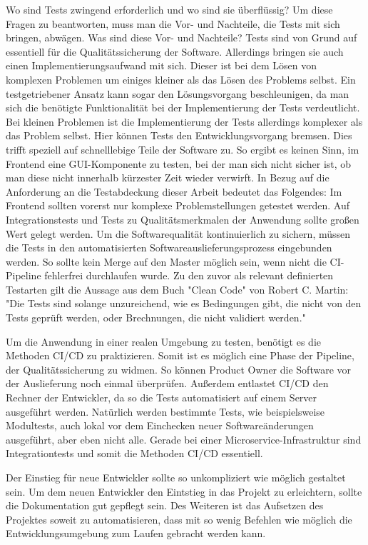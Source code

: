 Wo sind Tests zwingend erforderlich und wo sind sie überflüssig? Um diese Fragen zu beantworten, muss
man die Vor- und Nachteile, die Tests mit sich bringen, abwägen. Was sind diese Vor- und Nachteile?
Tests sind von Grund auf essentiell für die Qualitätssicherung der Software. Allerdings bringen sie auch
einen Implementierungsaufwand mit sich. Dieser ist bei dem Lösen von komplexen Problemen um einiges kleiner
als das Lösen des Problems selbst. Ein testgetriebener Ansatz kann sogar den Lösungsvorgang beschleunigen,
da man sich die benötigte Funktionalität bei der Implementierung der Tests verdeutlicht.
Bei kleinen Problemen ist die Implementierung der Tests allerdings komplexer als das Problem selbst.
Hier können Tests den Entwicklungsvorgang bremsen. Dies trifft speziell auf schnelllebige Teile der 
Software zu. So ergibt es keinen Sinn, im Frontend eine GUI-Komponente zu testen, bei der man sich nicht sicher ist,
ob man diese nicht innerhalb kürzester Zeit wieder verwirft. In Bezug
auf die Anforderung an die Testabdeckung dieser Arbeit bedeutet das Folgendes:
Im Frontend sollten vorerst nur komplexe Problemstellungen getestet werden. Auf Integrationstests und Tests
zu Qualitätsmerkmalen der Anwendung sollte großen Wert gelegt werden. Um die Softwarequalität kontinuierlich
zu sichern, müssen die Tests in den automatisierten Softwareauslieferungsprozess eingebunden werden. 
So sollte kein Merge auf den Master möglich sein, wenn nicht die CI-Pipeline fehlerfrei durchlaufen wurde.
Zu den zuvor als relevant definierten Testarten gilt die Aussage aus dem Buch "Clean Code" von Robert C. Martin:
"Die Tests sind solange unzureichend, wie es Bedingungen gibt, die nicht von den Tests geprüft werden,
oder Brechnungen, die nicht validiert werden."\cite[S. 370]{CleanCode}

Um die Anwendung in einer realen Umgebung zu testen, benötigt es die Methoden CI/CD
zu praktizieren. Somit ist es möglich eine Phase der Pipeline, der Qualitätssicherung zu widmen.
So können Product Owner die Software vor der Auslieferung noch einmal überprüfen. Außerdem
entlastet CI/CD den Rechner der Entwickler, da so die Tests automatisiert auf einem Server
ausgeführt werden. Natürlich werden bestimmte Tests, wie beispielsweise Modultests, auch 
lokal vor dem Einchecken neuer Softwareänderungen ausgeführt, aber eben nicht alle. Gerade
bei einer Microservice-Infrastruktur sind Integrationtests und somit die Methoden CI/CD essentiell.

Der Einstieg für neue Entwickler sollte so unkompliziert wie möglich gestaltet sein. Um dem neuen
Entwickler den Eintstieg in das Projekt zu erleichtern, sollte die Dokumentation gut gepflegt sein.
Des Weiteren ist das Aufsetzen des Projektes soweit zu automatisieren, dass mit so wenig Befehlen
wie möglich die Entwicklungsumgebung zum Laufen gebracht werden kann.

